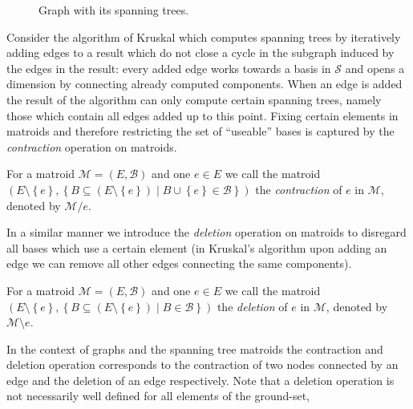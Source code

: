 \documentclass{scrartcl}
\theoremstyle{nonumberplain}
\newcommand{\tupel}[1]{\left(#1\right)}
\newcommand{\set}[1]{\left\{#1\right\}}
\begin{document}
\begin{figure}
  \begin{center}
  \end{center}
  \caption{Graph with its spanning trees.}
  \label{fig:spanning}
\end{figure}
Consider the algorithm of Kruskal \cite{kruskal} which computes spanning trees
by iteratively adding edges to a result which do not close a cycle in the
subgraph induced by the edges in the result: every added
edge works towards a basis in $\mathcal{S}$ and opens a dimension by connecting
already computed components. When an edge is added the result of the algorithm
can only compute certain spanning trees, namely those which contain all edges
added up to this point. Fixing certain elements in matroids and therefore
restricting the set of \enquote{useable} bases is captured by the
\emph{contraction} operation on matroids.
\begin{defi}
  For a matroid $\mathcal{M} = \tupel{E, \mathcal{B}}$ and one $e\in E$ we call
  the matroid $\tupel{E\setminus\set{e}, \set{B\subseteq
  (E\setminus\set{e})\middle| B\cup\set{e}\in\mathcal{B}}}$ the
  \emph{contraction} of $e$ in $\mathcal{M}$, denoted by $\mathcal{M}/e$.
\end{defi}
In a similar manner we introduce the \emph{deletion} operation on matroids to
disregard all bases which use a certain element (in Kruskal's algorithm upon
adding an edge we can remove all other edges connecting the same components).
\begin{defi}
  For a matroid $\mathcal{M} = \tupel{E, \mathcal{B}}$ and one $e\in E$ we call
  the matroid $\tupel{E\setminus\set{e}, \set{B\subseteq
  (E\setminus\set{e})\middle| B\in\mathcal{B}}}$ the \emph{deletion} of $e$ in
  $\mathcal{M}$, denoted by $\mathcal{M}\setminus e$.
\end{defi}
In the context of graphs and the spanning tree matroids the contraction and
deletion operation corresponds to the contraction of two nodes connected by
an edge and the deletion of an edge respectively. Note that a deletion
operation is not necessarily well defined for all elements of the ground-set,
\end{document}
